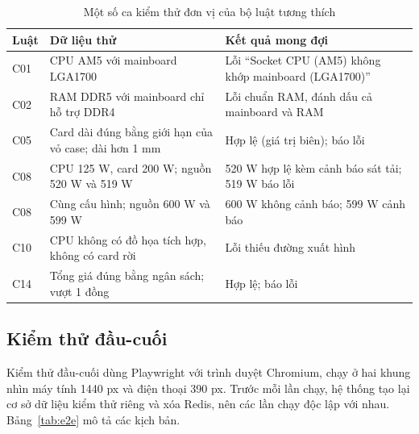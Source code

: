 \begin{table}[H]
\centering\footnotesize\renewcommand{\arraystretch}{1.15}
\begin{tabular}{|C{1cm}|L{6.2cm}|L{6.4cm}|}
\hline
\textbf{Luật} & \textbf{Dữ liệu thử} & \textbf{Kết quả mong đợi} \\ \hline
C01 & CPU AM5 với mainboard LGA1700 & Lỗi ``Socket CPU (AM5) không khớp mainboard (LGA1700)'' \\ \hline
C02 & RAM DDR5 với mainboard chỉ hỗ trợ DDR4 & Lỗi chuẩn RAM, đánh dấu cả mainboard và RAM \\ \hline
C05 & Card dài đúng bằng giới hạn của vỏ case; dài hơn 1 mm & Hợp lệ (giá trị biên); báo lỗi \\ \hline
C08 & CPU 125 W, card 200 W; nguồn 520 W và 519 W & 520 W hợp lệ kèm cảnh báo sát tải; 519 W báo lỗi \\ \hline
C08 & Cùng cấu hình; nguồn 600 W và 599 W & 600 W không cảnh báo; 599 W cảnh báo \\ \hline
C10 & CPU không có đồ họa tích hợp, không có card rời & Lỗi thiếu đường xuất hình \\ \hline
C14 & Tổng giá đúng bằng ngân sách; vượt 1 đồng & Hợp lệ; báo lỗi \\ \hline
\end{tabular}
\caption{Một số ca kiểm thử đơn vị của bộ luật tương thích}
\label{tab:test-luat}
\end{table}

\subsection{Kiểm thử đầu-cuối}

Kiểm thử đầu-cuối dùng Playwright với trình duyệt Chromium, chạy ở hai khung nhìn máy tính 1440 px và điện thoại 390 px. Trước mỗi lần chạy, hệ thống tạo lại cơ sở dữ liệu kiểm thử riêng và xóa Redis, nên các lần chạy độc lập với nhau. Bảng~\ref{tab:e2e} mô tả các kịch bản.

